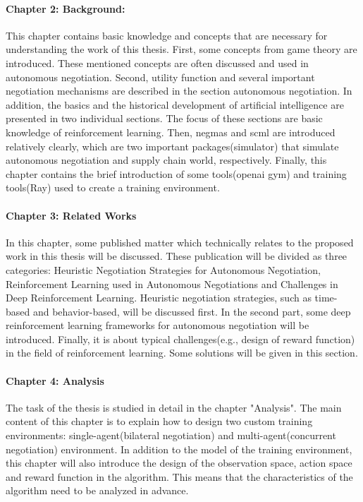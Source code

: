 \paragraph{Chapter 2: Background:}
This chapter contains basic knowledge and concepts that are necessary for understanding the work of this thesis. First, some concepts from game theory are introduced. These mentioned concepts are often discussed and used in autonomous negotiation. Second, utility function and several important negotiation mechanisms are described in the section autonomous negotiation. In addition, the basics and the historical development of artificial intelligence are presented in two individual sections. The focus of these sections are basic knowledge of reinforcement learning. Then, \gls{negmas} and \gls{scml} are introduced relatively clearly, which are two important packages(simulator) that simulate autonomous negotiation and supply chain world, respectively. Finally, this chapter contains the brief introduction of some tools(\gls{openai gym}) and training tools(Ray) used to create a training environment.

\paragraph{Chapter 3: Related Works}
In this chapter, some published matter which technically relates to the proposed work in this thesis will be discussed. These publication will be divided as three categories: Heuristic Negotiation Strategies for Autonomous Negotiation, Reinforcement Learning used in Autonomous Negotiations and Challenges in Deep Reinforcement Learning. Heuristic negotiation strategies, such as time-based and behavior-based, will be discussed first. In the second part, some deep reinforcement learning frameworks for autonomous negotiation will be introduced. Finally, it is about typical challenges(e.g., design of reward function) in the field of reinforcement learning. Some solutions will be given in this section.

\paragraph{Chapter 4: Analysis}
The task of the thesis is studied in detail in the chapter "Analysis". The main content of this chapter is to explain how to design two custom training environments: single-agent(bilateral negotiation) and multi-agent(concurrent negotiation) environment. In addition to the model of the training environment, this chapter will also introduce the design of the observation space, action space and reward function in the algorithm.
This means that the characteristics of the algorithm need to be analyzed in advance.

